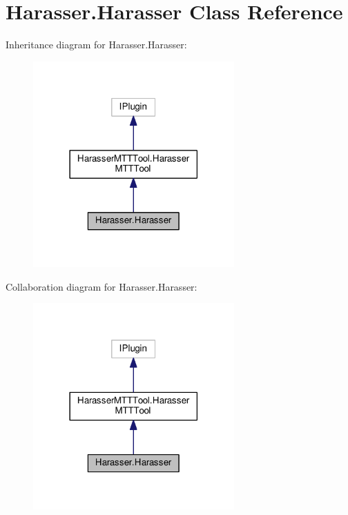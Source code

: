 \hypertarget{class_harasser_1_1_harasser}{\section{Harasser.\-Harasser Class Reference}
\label{class_harasser_1_1_harasser}
}


Inheritance diagram for Harasser.\-Harasser\-:
\nopagebreak
\begin{figure}[H]
\begin{center}
\leavevmode
\includegraphics[width=218pt]{class_harasser_1_1_harasser__inherit__graph}
\end{center}
\end{figure}


Collaboration diagram for Harasser.\-Harasser\-:
\nopagebreak
\begin{figure}[H]
\begin{center}
\leavevmode
\includegraphics[width=218pt]{class_harasser_1_1_harasser__coll__graph}
\end{center}
\end{figure}
